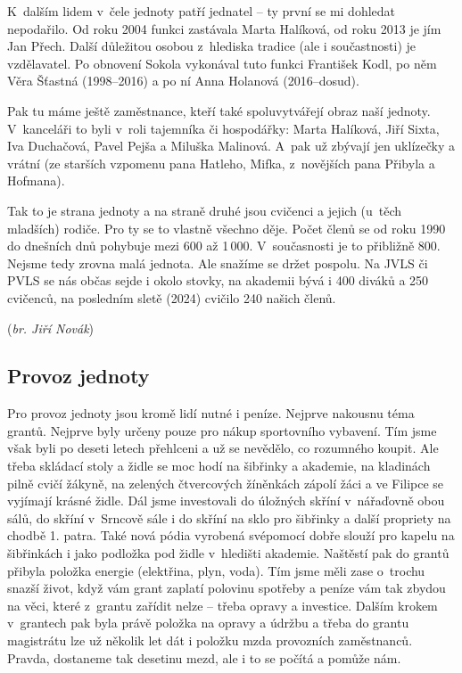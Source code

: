 \documentclass[a5paper, 11pt, twoside]{article}
\begin{document}
K~dalším lidem v~čele jednoty patří jednatel -- ty první se mi dohledat
nepodařilo. Od roku 2004 funkci zastávala Marta Halíková, od roku 2013
je jím Jan Přech. Další důležitou osobou z~hlediska tradice (ale i
součastnosti) je vzdělavatel. Po obnovení Sokola vykonával tuto funkci
František Kodl, po něm Věra Šťastná (1998--2016) a po ní Anna Holanová
(2016--dosud).

Pak tu máme ještě zaměstnance, kteří také spoluvytvářejí obraz naší
jednoty. V~kanceláři to byli v~roli tajemníka či hospodářky: Marta
Halíková, Jiří Sixta, Iva Duchačová, Pavel Pejša a Miluška Malinová.
A~pak už zbývají jen uklízečky a vrátní (ze starších vzpomenu pana
Hatleho, Mifka, z~novějších pana Přibyla a Hofmana).

Tak to je strana jednoty a na straně druhé jsou cvičenci a jejich
(u~těch mladších) rodiče. Pro ty se to vlastně všechno děje. Počet členů se
od roku 1990 do dnešních dnů pohybuje mezi 600 až 1\,000. V~současnosti
je to přibližně 800. Nejsme tedy zrovna malá jednota. Ale snažíme se
držet pospolu. Na JVLS či PVLS se nás občas sejde i okolo stovky, na
akademii bývá i 400 diváků a 250 cvičenců, na posledním sletě (2024)
cvičilo 240 našich členů.

\hfill(\textit{br. Jiří Novák})

\subsection{Provoz jednoty}

{\sloppy Pro provoz jednoty jsou kromě lidí nutné i peníze. Nejprve nakousnu téma
grantů. Nejprve byly určeny pouze pro nákup sportovního vybavení. Tím
jsme však byli po deseti letech přehlceni a už se nevědělo, co rozumného
koupit. Ale třeba skládací stoly a židle se moc hodí na šibřinky a
akademie, na kladinách pilně cvičí žákyně, na zelených čtvercových
žíněnkách zápolí žáci a ve Filipce se vyjímají krásné židle. Dál jsme
investovali do úložných skříní v~nářaďovně obou sálů, do skříní
v~Srncově sále i do skříní na sklo pro šibřinky a další propriety na
chodbě 1. patra. Také nová pódia vyrobená svépomocí dobře slouží pro
kapelu na šibřinkách i jako podložka pod židle v~hledišti akademie.
Naštěstí pak do grantů přibyla položka energie (elektřina, plyn, voda).
Tím jsme měli zase o~trochu snazší život, když vám grant zaplatí
polovinu spotřeby a peníze vám tak zbydou na věci, které z~grantu
zařídit nelze -- třeba opravy a investice. Dalším krokem v~grantech pak
byla právě položka na opravy a údržbu a třeba do grantu magistrátu lze
už několik let dát i položku mzda provozních zaměstnanců. Pravda,
dostaneme tak desetinu mezd, ale i to se počítá a pomůže nám. \par}
\end{document}
